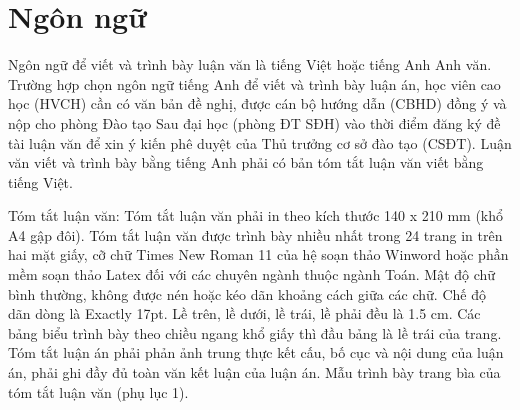 \chapter{Ngôn ngữ}
\label{Chapter1}

Ngôn ngữ để viết và trình bày luận văn là tiếng Việt hoặc tiếng Anh Anh văn. 
Trường hợp chọn ngôn ngữ tiếng Anh để viết và trình bày luận án, học viên cao học (HVCH) cần có văn bản đề nghị, được cán bộ hướng dẫn (CBHD) đồng ý và nộp cho phòng Đào tạo Sau đại học (phòng ĐT SĐH) vào thời điểm đăng ký đề tài luận văn để xin ý kiến phê duyệt của Thủ trưởng cơ sở đào tạo (CSĐT).
Luận văn viết và trình bày bằng tiếng Anh phải có bản tóm tắt luận văn viết bằng tiếng Việt.

Tóm tắt luận văn: Tóm tắt luận văn phải in theo kích thước 140 x 210 mm (khổ A4 gập đôi).
Tóm tắt luận văn được trình bày nhiều nhất trong 24 trang in trên hai mặt giấy, cỡ chữ Times New Roman 11 của hệ soạn thảo Winword hoặc phần mềm soạn thảo Latex đối với các chuyên ngành thuộc ngành Toán.
Mật độ chữ bình thường, không được nén hoặc kéo dãn khoảng cách giữa các chữ.
Chế độ dãn dòng là Exactly 17pt.
Lề trên, lề dưới, lề trái, lề phải đều là 1.5 cm.
Các bảng biểu trình bày theo chiều ngang khổ giấy thì đầu bảng là lề trái của trang.
Tóm tắt luận án phải phản ảnh trung thực kết cấu, bố cục và nội dung của luận án, phải ghi đầy đủ toàn văn kết luận của luận án.
Mẫu trình bày trang bìa của tóm tắt luận văn (phụ lục 1).